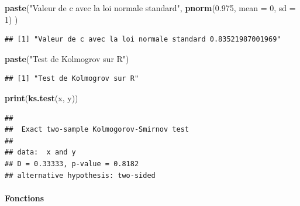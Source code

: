 \documentclass[
  12pt,
]{article}
\newenvironment{Shaded}{\begin{snugshade}}{\end{snugshade}}
\newcommand{\AttributeTok}[1]{\textcolor[rgb]{0.13,0.29,0.53}{#1}}
\newcommand{\DecValTok}[1]{\textcolor[rgb]{0.00,0.00,0.81}{#1}}
\newcommand{\FloatTok}[1]{\textcolor[rgb]{0.00,0.00,0.81}{#1}}
\newcommand{\FunctionTok}[1]{\textcolor[rgb]{0.13,0.29,0.53}{\textbf{#1}}}
\newcommand{\NormalTok}[1]{#1}
\newcommand{\StringTok}[1]{\textcolor[rgb]{0.31,0.60,0.02}{#1}}
\begin{document}
\begin{Shaded}
\begin{Highlighting}[]
\FunctionTok{paste}\NormalTok{(}\StringTok{"Valeur de c avec la loi normale standard"}\NormalTok{, }\FunctionTok{pnorm}\NormalTok{(}\FloatTok{0.975}\NormalTok{, }\AttributeTok{mean =} \DecValTok{0}\NormalTok{, }\AttributeTok{sd =} \DecValTok{1}\NormalTok{)}
\NormalTok{)}
\end{Highlighting}
\end{Shaded}

\begin{verbatim}
## [1] "Valeur de c avec la loi normale standard 0.83521987001969"
\end{verbatim}

\begin{Shaded}
\begin{Highlighting}[]
\FunctionTok{paste}\NormalTok{(}\StringTok{"Test de Kolmogrov sur R"}\NormalTok{)}
\end{Highlighting}
\end{Shaded}

\begin{verbatim}
## [1] "Test de Kolmogrov sur R"
\end{verbatim}

\begin{Shaded}
\begin{Highlighting}[]
\FunctionTok{print}\NormalTok{(}\FunctionTok{ks.test}\NormalTok{(x, y))}
\end{Highlighting}
\end{Shaded}

\begin{verbatim}
## 
##  Exact two-sample Kolmogorov-Smirnov test
## 
## data:  x and y
## D = 0.33333, p-value = 0.8182
## alternative hypothesis: two-sided
\end{verbatim}

\paragraph{Fonctions}\label{fonctions}
\end{document}
